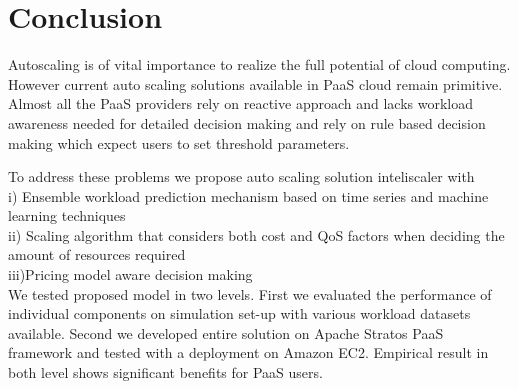 \section{Conclusion}

Autoscaling is of vital importance to realize the full potential of cloud computing. However current auto scaling solutions available in PaaS cloud remain primitive. Almost all the PaaS providers rely on reactive approach and lacks workload awareness needed for detailed decision making and rely on rule based decision making which expect users to set threshold parameters. 

To address these problems we propose auto scaling solution inteliscaler with\\
i)  Ensemble workload prediction mechanism based on time series and machine learning techniques \\ 
ii) Scaling algorithm that considers both cost and QoS factors when deciding the amount of resources required\\
iii)Pricing model aware decision making\\

We tested proposed model in two levels. First we evaluated the performance of individual components on simulation set-up with various workload datasets available. Second we developed entire solution on Apache Stratos PaaS framework and tested with a deployment on Amazon EC2. Empirical result in both level shows significant benefits for PaaS users.



